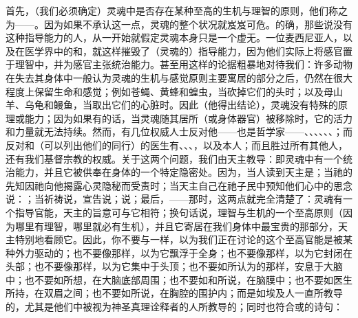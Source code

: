 首先，（我们必须确定）灵魂中是否存在某种至高的生机与理智的原则，他们称之为——。因为如果不承认这一点，灵魂的整个状况就岌岌可危。的确，那些说没有这种指导能力的人，从一开始就假定灵魂本身只是一个虚无。一位麦西尼亚人，以及在医学界中的和，就这样摧毁了（灵魂的）指导能力，因为他们实际上将感官置于理智中，并为感官主张统治能力。甚至用这样的论据粗暴地对待我们：许多动物在失去其身体中一般认为灵魂的生机与感觉原则主要寓居的部分之后，仍然在很大程度上保留生命和感觉；例如苍蝇、黄蜂和蝗虫，当砍掉它们的头时；以及母山羊、乌龟和鳗鱼，当取出它们的心脏时。因此（他得出结论），灵魂没有特殊的原理或能力；因为如果有的话，当灵魂随其居所（或身体器官）被移除时，它的活力和力量就无法持续。然而，有几位权威人士反对他——也是哲学家——、、、、、、；而反对和（可以列出他们的同行）的医生有、、、，以及本人；而且胜过所有其他人，还有我们基督宗教的权威。关于这两个问题，我们由天主教导：即灵魂中有一个统治能力，并且它被供奉在身体的一个特定隐密处。因为，当人读到天主是；当祂的先知因祂向他揭露心灵隐秘而受责时；当天主自己在祂子民中预知他们心中的思念说：；当祈祷说，宣告说；说；最后，——那时，这两点就完全清楚了：灵魂有一个指导官能，天主的旨意可与它相符；换句话说，理智与生机的一个至高原则（因为哪里有理智，哪里就必有生机），并且它寄居在我们身体中最宝贵的那部分，天主特别地看顾它。因此，你不要与一样，以为我们正在讨论的这个至高官能是被某种外力驱动的；也不要像那样，以为它飘浮于全身；也不要像那样，以为它封闭在头部；也不要像那样，以为它集中于头顶；也不要如所认为的那样，安息于大脑中；也不要如所想，在大脑底部周围；也不要如和所说，在脑膜中；也不要如医生所持，在双眉之间；也不要如所说，在胸腔的围护内；而是如埃及人一直所教导的，尤其是他们中被视为神圣真理诠释者的人所教导的；同时也符合或的诗句：\par

